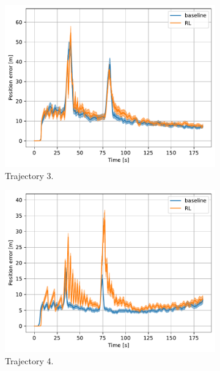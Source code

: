 \documentclass[english, 12pt, a4paper, elec, utf8, a-1b, online]{aaltothesis}
\begin{document}
\begin{figure}[htb]
    \hfill
    \begin{subfigure}[b]{0.45\textwidth}
        \centering
        \includegraphics[width=\linewidth]{figures/benchmark/Simulations/mean_position_error2.pdf}
        \caption{Trajectory 3.}
        \label{fig:PE_T3}
    \end{subfigure}
    \hfill
    \begin{subfigure}[b]{0.45\textwidth}
        \centering
        \includegraphics[width=\linewidth]{figures/benchmark/Simulations/mean_position_error3.pdf}
        \caption{Trajectory 4.}
        \label{fig:PE_T4}
    \end{subfigure}
    \hfill
    \begin{subfigure}[b]{0.45\textwidth}

\end{subfigure}
\end{figure}
\end{document}
